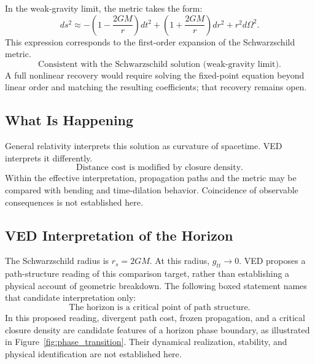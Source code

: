 In the weak-gravity limit, the metric takes the form:
\begin{equation}
  \label{eq:schwarzschild_weak}
  \boxed{
    ds^2
    \approx
    -\!\left(1-\frac{2GM}{r}\right)dt^2
    +\left(1+\frac{2GM}{r}\right)dr^2
    + r^2 d\Omega^2.
  }
\end{equation}
This expression corresponds to the first-order expansion of the Schwarzschild metric.
\begin{equation}
  \boxed{\text{Consistent with the Schwarzschild solution (weak-gravity limit).}}
\end{equation}
A full nonlinear recovery would require solving the fixed-point equation beyond
linear order and matching the resulting coefficients; that recovery remains
open.

\subsection{What Is Happening}

General relativity interprets this solution as curvature of spacetime.
VED interprets it differently.
\begin{equation}
  \boxed{\text{Distance cost is modified by closure density.}}
\end{equation}
Within the effective interpretation, propagation paths and the metric may be
compared with bending and time-dilation behavior.  Coincidence of observable
consequences is not established here.

\subsection{VED Interpretation of the Horizon}

The Schwarzschild radius is $r_s = 2GM$.
At this radius, $g_{tt} \to 0$.
VED proposes a path-structure reading of this comparison target, rather than
establishing a physical account of geometric breakdown. The following boxed
statement names that candidate interpretation only:
\begin{equation}
  \boxed{\text{The horizon is a critical point of path structure.}}
\end{equation}
In this proposed reading, divergent path cost, frozen propagation, and a
critical closure density are candidate features of a horizon phase boundary,
as illustrated in Figure~\ref{fig:phase_transition}. Their dynamical realization,
stability, and physical identification are not established here.

